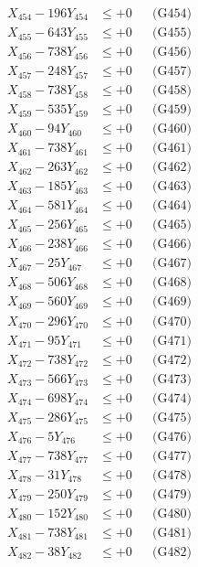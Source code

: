 \documentclass[a4paper,10pt]{article}
\begin{document}
{\begin{align}
X_{454} - 196Y_{454} &\leq +0 && \text{(G454)} \\
X_{455} - 643Y_{455} &\leq +0 && \text{(G455)} \\
X_{456} - 738Y_{456} &\leq +0 && \text{(G456)} \\
X_{457} - 248Y_{457} &\leq +0 && \text{(G457)} \\
X_{458} - 738Y_{458} &\leq +0 && \text{(G458)} \\
X_{459} - 535Y_{459} &\leq +0 && \text{(G459)} \\
X_{460} - 94Y_{460} &\leq +0 && \text{(G460)} \\
\allowbreak
X_{461} - 738Y_{461} &\leq +0 && \text{(G461)} \\
X_{462} - 263Y_{462} &\leq +0 && \text{(G462)} \\
X_{463} - 185Y_{463} &\leq +0 && \text{(G463)} \\
X_{464} - 581Y_{464} &\leq +0 && \text{(G464)} \\
X_{465} - 256Y_{465} &\leq +0 && \text{(G465)} \\
X_{466} - 238Y_{466} &\leq +0 && \text{(G466)} \\
X_{467} - 25Y_{467} &\leq +0 && \text{(G467)} \\
X_{468} - 506Y_{468} &\leq +0 && \text{(G468)} \\
X_{469} - 560Y_{469} &\leq +0 && \text{(G469)} \\
X_{470} - 296Y_{470} &\leq +0 && \text{(G470)} \\
\allowbreak
X_{471} - 95Y_{471} &\leq +0 && \text{(G471)} \\
X_{472} - 738Y_{472} &\leq +0 && \text{(G472)} \\
X_{473} - 566Y_{473} &\leq +0 && \text{(G473)} \\
X_{474} - 698Y_{474} &\leq +0 && \text{(G474)} \\
X_{475} - 286Y_{475} &\leq +0 && \text{(G475)} \\
X_{476} - 5Y_{476} &\leq +0 && \text{(G476)} \\
X_{477} - 738Y_{477} &\leq +0 && \text{(G477)} \\
X_{478} - 31Y_{478} &\leq +0 && \text{(G478)} \\
X_{479} - 250Y_{479} &\leq +0 && \text{(G479)} \\
X_{480} - 152Y_{480} &\leq +0 && \text{(G480)} \\
\allowbreak
X_{481} - 738Y_{481} &\leq +0 && \text{(G481)} \\
X_{482} - 38Y_{482} &\leq +0 && \text{(G482)} \\

\end{align}}
\end{document}
